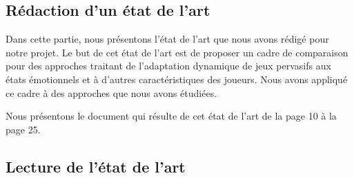 \documentclass[11pt]{article}
\begin{document}
	\subsection{Rédaction d'un état de l'art}\label{sec:eda}
		Dans cette partie, nous présentons l'état de l'art que nous avons rédigé pour notre projet.
		Le but de cet état de l'art est de proposer un cadre de comparaison pour des approches traitant de l'adaptation dynamique de jeux pervasifs aux états émotionnels et à d'autres caractéristiques des joueurs.
		Nous avons appliqué ce cadre à des approches que nous avons étudiées.\par
		Nous présentons le document qui résulte de cet état de l'art de la page 10 à la page 25.
		\makeatletter
		
		\makeatother
	\subsection{Lecture de l'état de l'art}
\end{document}
